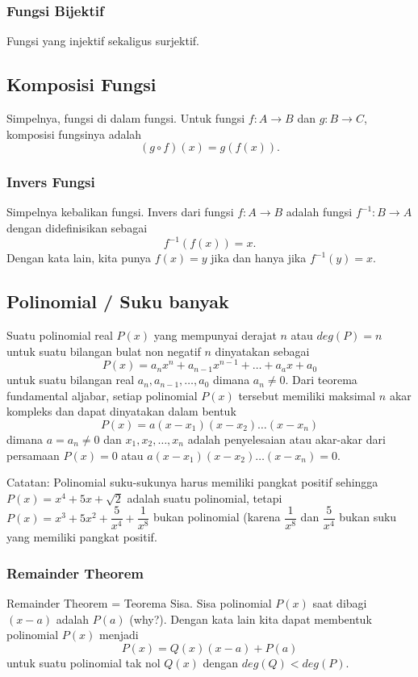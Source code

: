 \documentclass[11pt]{scrartcl}
\begin{document}
    \subsubsection{Fungsi Bijektif}
    Fungsi yang injektif sekaligus surjektif.
    
    \subsection{Komposisi Fungsi}
    Simpelnya, fungsi di dalam fungsi. Untuk fungsi $f:A \rightarrow B$ dan $g:B \rightarrow C$, komposisi fungsinya adalah
    $$(g \circ f)(x) = g(f(x)).$$
    
    \subsubsection{Invers Fungsi}
    Simpelnya kebalikan fungsi. Invers dari fungsi $f: A \rightarrow B$ adalah fungsi $f^{-1} : B \rightarrow A$ dengan didefinisikan sebagai
    $$f^{-1}(f(x))=x.$$
    Dengan kata lain, kita punya $f(x)=y$ jika dan hanya jika $f^{-1}(y)=x$.
    
    \subsection{Polinomial / Suku banyak}
    Suatu polinomial real $P(x)$ yang mempunyai derajat $n$ atau $deg(P) = n$ untuk suatu bilangan bulat non negatif $n$ dinyatakan sebagai
    $$P(x)=a_nx^n+a_{n-1}x^{n-1}+\dots+a_ax+a_0$$
    untuk suatu bilangan real $a_n,a_{n-1},\dots,a_0$ dimana $a_n \neq 0$. Dari teorema fundamental aljabar, setiap polinomial $P(x)$ tersebut memiliki maksimal $n$ akar kompleks dan dapat dinyatakan dalam bentuk
    $$P(x)=a(x-x_1)(x-x_2)\dots(x-x_n)$$
    dimana $a = a_n \neq 0$ dan $x_1,x_2,\dots,x_n$ adalah penyelesaian atau akar-akar dari persamaan $P(x)=0$ atau $a(x-x_1)(x-x_2)\dots(x-x_n)=0$.
    
    Catatan: Polinomial suku-sukunya harus memiliki pangkat positif sehingga $P(x)=x^4+5x+\sqrt{2}$ adalah suatu polinomial, tetapi $P(x)=x^3+5x^2+\dfrac{5}{x^4}+\dfrac{1}{x^8}$ bukan polinomial (karena $\dfrac{1}{x^8}$ dan $\dfrac{5}{x^4}$ bukan suku yang memiliki pangkat positif.
    
    \subsubsection{Remainder Theorem}
    Remainder Theorem = Teorema Sisa.
    Sisa polinomial $P(x)$ saat dibagi $(x-a)$ adalah $P(a)$ (why?).
    Dengan kata lain kita dapat membentuk polinomial $P(x)$ menjadi
    $$P(x)=Q(x)(x-a)+P(a)$$
    untuk suatu polinomial tak nol $Q(x)$ dengan $deg(Q)<deg(P)$.
    
\end{document}
